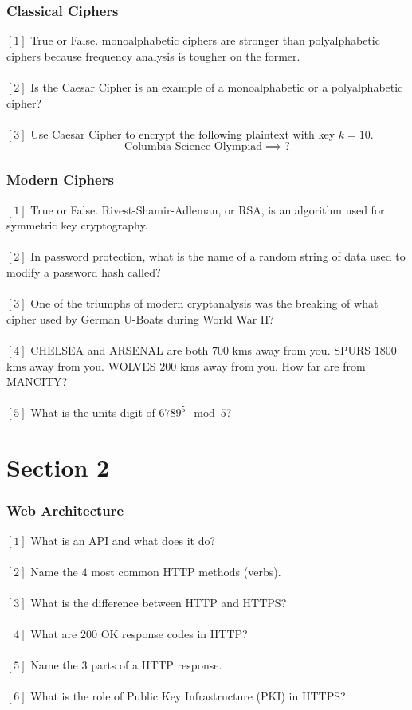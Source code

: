 \documentclass[letterpaper,12pt,addpoints]{exam}
\begin{document}
\subsubsection*{Classical Ciphers}
$[1]$ True or False. monoalphabetic ciphers are stronger than polyalphabetic ciphers because frequency analysis is tougher on the former.\\
\\
$[2]$ Is the Caesar Cipher is an example of a monoalphabetic or a polyalphabetic cipher?\\
\\
$[3]$ Use Caesar Cipher to encrypt the following plaintext with key $k=10$.
$$
\text{Columbia Science Olympiad} \implies ?
$$
\subsubsection*{Modern Ciphers}
$[1]$ True or False. Rivest-Shamir-Adleman, or RSA, is an algorithm used for symmetric key cryptography.\\
\\
$[2]$ In password protection, what is the name of a random string of data used to modify a password hash called?\\
\\
$[3]$ One of the triumphs of modern cryptanalysis was the breaking of what cipher used by German U-Boats during World War II?\\
\\
$[4]$ CHELSEA and ARSENAL are both $700$ kms away from you. SPURS $1800$ kms away from you. WOLVES $200$ kms away from you. How far are from MANCITY?\\
\\
$[5]$ What is the units digit of $6789^5 \mod 5$?

\pagebreak
\section*{Section 2}
\subsubsection*{Web Architecture}
$[1]$ What is an API and what does it do? \\
\\
$[2]$ Name the $4$ most common HTTP methods (verbs).\\
\\
$[3]$ What is the difference between HTTP and HTTPS?\\
\\
$[4]$ What are 200 OK response codes in HTTP?\\
\\
$[5]$ Name the 3 parts of a HTTP response.\\
\\
$[6]$ What is the role of Public Key Infrastructure (PKI) in HTTPS?
\end{document}

